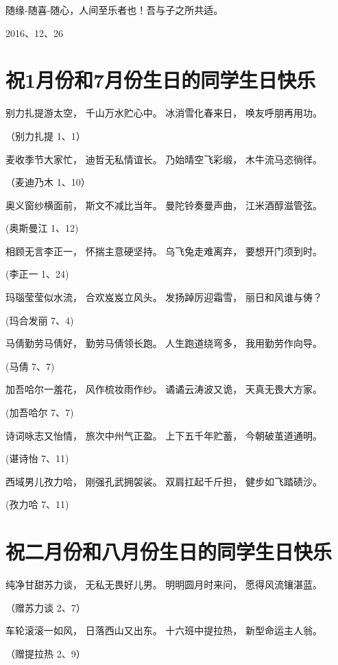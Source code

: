 \documentclass[openany]{ctexbook}
\begin{document}
随缘-随喜-随心，人间至乐者也！吾与子之所共适。

2016、12、26

\chapter*{祝1月份和7月份生日的同学生日快乐}\label{birthday1}

别力扎提游太空， 千山万水贮心中。 冰消雪化春来日， 唤友呼朋再用功。

（别力扎提 1、1）

麦收季节大家忙， 迪哲无私情谊长。 乃始晴空飞彩缎， 木牛流马恣徜徉。

（麦迪乃木 1、10）

奥义窗纱横面前， 斯文不减比当年。 曼陀铃奏曼声曲， 江米酒醇滋管弦。

(奥斯曼江 1、12)

相顾无言李正一， 怀揣主意硬坚持。 乌飞兔走难离弃， 要想开门须到时。

(李正一 1、24)

玛瑙莹莹似水流， 合欢岌岌立风头。 发扬踔厉迎霜雪， 丽日和风谁与俦？

(玛合发丽 7、4)

马倩勤劳马倩好， 勤劳马倩领长跑。 人生跑道绕弯多， 我用勤劳作向导。

(马倩 7、7)

加吾哈尔一羞花， 风作梳妆雨作纱。 谲谲云涛波又诡， 天真无畏大方家。

(加吾哈尔 7、7)

诗词咏志又怡情， 旅次中州气正盈。 上下五千年贮蓄， 今朝破茧道通明。

(谌诗怡 7、11)

西域男儿孜力哈， 刚强孔武拥袈裟。 双肩扛起千斤担， 健步如飞踏碛沙。

(孜力哈 7、11)

\chapter*{祝二月份和八月份生日的同学生日快乐}\label{birthday2}

纯净甘甜苏力谈， 无私无畏好儿男。 明明圆月时来问， 愿得风流镶湛蓝。

（赠苏力谈 2、7）

车轮滚滚一如风， 日落西山又出东。 十六班中提拉热， 新型命运主人翁。

（赠提拉热 2、9）
\end{document}
